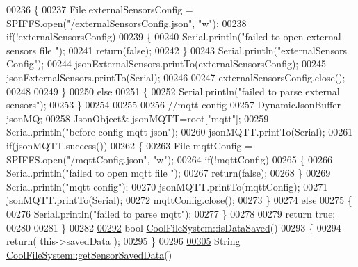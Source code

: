 \begin{DoxyCode}
00236     \{
00237         File externalSensorsConfig = SPIFFS.open(\textcolor{stringliteral}{"/externalSensorsConfig.json"}, \textcolor{stringliteral}{"w"});   
00238         \textcolor{keywordflow}{if}(!externalSensorsConfig)
00239         \{
00240             Serial.println(\textcolor{stringliteral}{"failed to open external sensors file "});
00241             \textcolor{keywordflow}{return}(\textcolor{keyword}{false});
00242         \}
00243         Serial.println(\textcolor{stringliteral}{"externalSensors Config"});
00244         jsonExternalSensors.printTo(externalSensorsConfig);
00245         jsonExternalSensors.printTo(Serial);
00246     
00247         externalSensorsConfig.close();
00248 
00249     \}
00250     \textcolor{keywordflow}{else}
00251     \{
00252         Serial.println(\textcolor{stringliteral}{"failed to parse external sensors"}); 
00253     \}
00254 
00255     
00256     \textcolor{comment}{//mqtt config}
00257     DynamicJsonBuffer jsonMQ;
00258         JsonObject& jsonMQTT=root[\textcolor{stringliteral}{"mqtt"}];
00259     Serial.println(\textcolor{stringliteral}{"before config mqtt json"});
00260     jsonMQTT.printTo(Serial);
00261     \textcolor{keywordflow}{if}(jsonMQTT.success())
00262     \{
00263         File mqttConfig = SPIFFS.open(\textcolor{stringliteral}{"/mqttConfig.json"}, \textcolor{stringliteral}{"w"}); 
00264         \textcolor{keywordflow}{if}(!mqttConfig)
00265         \{
00266             Serial.println(\textcolor{stringliteral}{"failed to open mqtt file "});        
00267             \textcolor{keywordflow}{return}(\textcolor{keyword}{false});
00268         \}
00269         Serial.println(\textcolor{stringliteral}{"mqtt config"});
00270         jsonMQTT.printTo(mqttConfig);
00271         jsonMQTT.printTo(Serial);
00272         mqttConfig.close();
00273     \}
00274     \textcolor{keywordflow}{else}
00275     \{
00276         Serial.println(\textcolor{stringliteral}{"failed to parse mqtt"}); 
00277     \}   
00278         
00279     \textcolor{keywordflow}{return} \textcolor{keyword}{true};
00280 
00281 \}   
00282 
\hyperlink{class_cool_file_system_a5a7eaeea7a9fbf8aaef651d862fa3b5b}{00292} \textcolor{keywordtype}{bool} \hyperlink{class_cool_file_system_a5a7eaeea7a9fbf8aaef651d862fa3b5b}{CoolFileSystem::isDataSaved}()
00293 \{
00294     \textcolor{keywordflow}{return}( this->savedData );
00295 \}
00296 
\hyperlink{class_cool_file_system_a5c58bca3735c0ed3efb268d70ef998ef}{00305} String \hyperlink{class_cool_file_system_a5c58bca3735c0ed3efb268d70ef998ef}{CoolFileSystem::getSensorSavedData}()

\end{DoxyCode}
